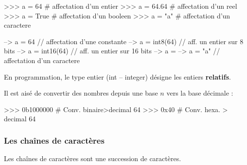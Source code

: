 \documentclass[10pt,fleqn]{article} %
\begin{document}
\begin{minipage}[c]{.45\linewidth}
\begin{py}
\begin{python}
>>> a = 64 # affectation d'un entier
>>> a = 64.64 # affectation d'un reel
>>> a = True # affectation d'un booleen
>>> a = "a" # affectation d'un caractere
\end{python}
\end{py}
\end{minipage}\hfill
\begin{minipage}[c]{.5\linewidth}
\begin{sci}
\begin{scilab}
--> a = 64 // affectation d'une constante
--> a = int8(64) // aff. un entier sur 8 bits
--> a = int16(64) // aff. un entier sur 16 bits
--> a = %
--> a = "a" // affectation d'un caractere
\end{scilab}
\end{sci}
\end{minipage}

\begin{rem}
En programmation, le type entier (\textsf{int} -- \textsf{integer}) désigne les entiers \textbf{relatifs}.
\end{rem}

\begin{exemple}
Il est aisé de convertir des nombres depuis une base $n$ vers la base décimale : 

\begin{minipage}[c]{.45\linewidth}
\begin{py}
\begin{python}
>>> 0b1000000 # Conv. binaire>decimal
	64
>>> 0x40 # Conv. hexa. > decimal
	64
\end{python}
\end{py}
\end{minipage}\hfill
\begin{minipage}[c]{.45\linewidth}
\end{minipage}
\end{exemple}




\subsubsection{Les chaînes de caractères}
\begin{defi}
Les chaînes de caractères sont une succession de caractères. 
\end{defi}
\end{document}
